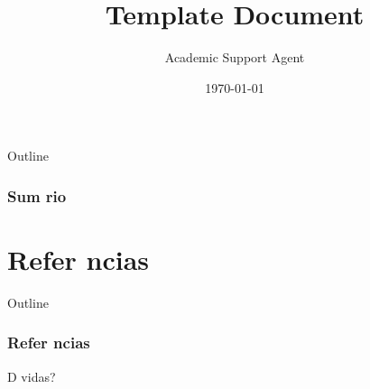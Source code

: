 \documentclass{article}
\title{Template Document}
\author{Academic Support Agent}
\date{\today}
\begin{document}
\maketitle

\begin{frame}
\titlepage %
\end{frame}

\newcommand{\sumario}{
\begin{frame}[allowframebreaks]{Outline}
\frametitle{Sum rio} %

\end{frame}
}

\sumario





\section{Refer ncias}

\begin{frame}[allowframebreaks]{Outline}
\frametitle{Refer ncias}

\end{frame}


\begin{frame}
\centerline{D vidas?}
\titlepage
\end{frame}

\end{document}
